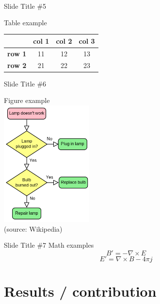 \documentclass{beamer}
\begin{document}
\begin{frame}{Slide Title \#5}
	\begin{center}
		Table example \\[12pt]
		\begin{tabular}{c||c|c|c|}
			& \textbf{col 1} & \textbf{col  2} & \textbf{col 3} \\
			\hline
			\hline
			\textbf{row 1} & 11 & 12 & 13 \\
			\hline
			\textbf{row 2} & 21 & 22 & 23 \\
		\end{tabular}
    \end{center}
\end{frame}

\begin{frame}{Slide Title \#6}
	\begin{center}
		Figure example \\[12pt]
		\includegraphics[width=0.35\textwidth,keepaspectratio]{LampFlowchart.png}
		\\
		\footnotesize(source: \textlatin{Wikipedia})
    \end{center}
\end{frame}

\begin{frame}{Slide Title \#7}
	\centering
	Math examples \\[12pt]
	\begin{equation}
        	B'=-\nabla \times E
	\end{equation}
	\begin{equation*}
        	E'=\nabla \times B - 4\pi j
	\end{equation*}
\end{frame}

\section{Results / contribution}
\end{document}
